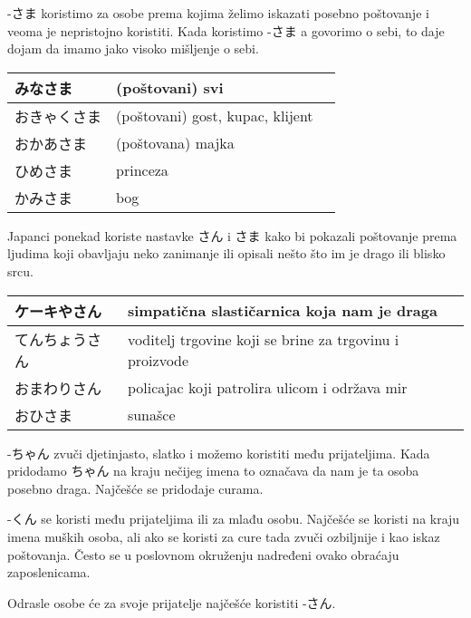 	-さま koristimo za osobe prema kojima želimo iskazati posebno poštovanje i veoma je nepristojno koristiti. Kada koristimo -さま a govorimo o sebi, to daje dojam da imamo jako visoko mišljenje o sebi.

	\begin{table}[!h]
	\begin{tabular}{|l|l|l|}
		\hline
		みなさま&(poštovani) svi\\\hline
		おきゃくさま&(poštovani) gost, kupac, klijent\\\hline
		おかあさま&(poštovana) majka\\\hline
		ひめさま&princeza\\\hline
		かみさま&bog\\\hline
	\end{tabular}
	\end{table}
	
	
	Japanci ponekad koriste nastavke さん i さま kako bi pokazali poštovanje prema ljudima koji obavljaju neko zanimanje ili opisali nešto što im je drago ili blisko srcu.
	
	\begin{table}[!h]
	\begin{tabular}{|l|l|}
		\hline
		ケーキやさん&simpatična slastičarnica koja nam je draga\\\hline
		てんちょうさん&voditelj trgovine koji se brine za trgovinu i proizvode\\\hline
		おまわりさん&policajac koji patrolira ulicom i održava mir\\\hline
		おひさま&sunašce\\\hline
	\end{tabular}
	\end{table}

\newpage

	-ちゃん zvuči djetinjasto, slatko i možemo koristiti među prijateljima. Kada pridodamo ちゃん na kraju nečijeg imena to označava da nam je ta osoba posebno draga. Najčešće se pridodaje curama.\newline
	
	
	-くん se koristi među prijateljima ili za mlađu osobu. Najčešće se koristi na kraju imena muških osoba, ali ako se koristi za cure tada zvuči ozbiljnije i kao iskaz poštovanja. Često se u poslovnom okruženju nadređeni ovako obraćaju zaposlenicama.\newline
	

Odrasle osobe će za svoje prijatelje najčešće koristiti -さん.\newline

